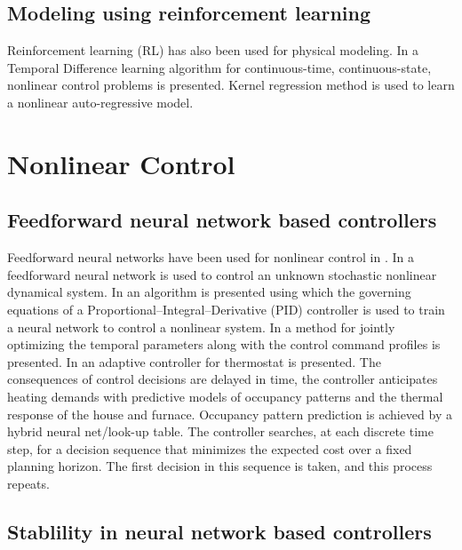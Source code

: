 \documentclass[conference]{IEEEtran}
\begin{document}
\subsection{\textbf{Modeling using reinforcement learning}}

Reinforcement learning (RL) has also been used for physical modeling. In \cite{doya1996nips} a Temporal Difference learning algorithm for continuous-time, continuous-state, nonlinear control problems is presented. Kernel regression method is used to learn a nonlinear auto-regressive model.  \\

\section{Nonlinear Control}

\subsection{\textbf{Feedforward neural network based controllers}}

Feedforward neural networks have been used for nonlinear control in \cite{milito1991nips, scott1992nips, rawlik2010nips, Mozer1996TheNP, chen2002ICDC, yu1996nips}. In \cite{milito1991nips} a feedforward neural network is used to control an unknown stochastic nonlinear dynamical system. In \cite{scott1992nips} an algorithm is presented using which the governing equations of a Proportional–Integral–Derivative (PID) controller is used to train a neural network to control a nonlinear system. In \cite{rawlik2010nips} a method for jointly optimizing the temporal parameters along with the control command profiles is presented. In \cite{Mozer1996TheNP} an adaptive controller for thermostat is presented. The consequences of control decisions are delayed in time, the controller anticipates heating demands with predictive models of occupancy patterns and the thermal response of the house and furnace. Occupancy pattern prediction is achieved by a hybrid neural net/look-up table. The controller searches, at each discrete time step, for a decision sequence that minimizes the expected cost over a fixed planning horizon. The first decision in this sequence is taken, and this process repeats.

\subsection{\textbf{Stablility in neural network based controllers}}
\end{document}
